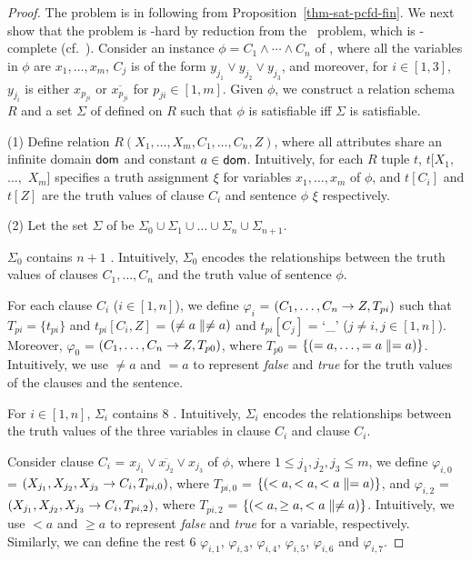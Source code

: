 \begin{proof}
The problem is in \NP following from
Proposition~\ref{thm-sat-pcfd-fin}. We next show that the problem is
\NP-hard by reduction from the \kSAT\ problem, which is \NP-complete
(cf.~\cite{GaJo79}). Consider an instance $\phi = C_1 \land \cdots
\land C_n$ of \kSAT, where all the variables in $\phi$ are $x_1,
\ldots, x_m$, $C_j$ is of the form $y_{j_1} \lor y_{j_2} \lor
y_{j_3}$, and moreover, for $i\in[1,3]$, $y_{j_i}$ is either
$x_{p_{ji}}$ or $\overline{x_{p_{ji}}}$ for $p_{ji} \in [1, m]$.
Given $\phi$, we construct a relation schema $R$ and a set $\Sigma$
of \pCFDs defined on $R$ such that $\phi$ is satisfiable iff
$\Sigma$ is satisfiable.

\noindent (1) Define relation $R$$(X_1, \ldots, X_m, C_1, \ldots,
C_n, Z)$, where all attributes share an infinite domain $\protect\mathsf{dom}$ and
constant $a\in\protect\mathsf{dom}$. Intuitively, for each $R$ tuple $t$, $t[X_1,$ $
\ldots,$ $X_m]$ specifies a truth assignment $\xi$ for variables
$x_1, \ldots, x_m$ of $\phi$, and $t[C_i]$ and $t[Z]$ are the truth
values of clause $C_i$ and sentence $\phi$ \wrt $\xi$ respectively.

\noindent (2) Let the set $\Sigma$ of \pCFDs be
$\Sigma_0\cup\Sigma_1\cup\ldots\cup\Sigma_n\cup\Sigma_{n+1}$.

\vspace{-1.5ex}\bi
\item $\Sigma_0$ contains $n + 1$ \pCFDs. Intuitively, $\Sigma_0$
encodes the relationships between the truth values of clauses $C_1,
\ldots, C_n$ and the truth value of sentence $\phi$.

For each clause $C_i$ ($i\in[1, n]$), we define \pCFD $\varphi_i$ =
$(C_1,\ldots, C_n\rightarrow Z, T_{pi})$ such that $T_{pi} = \{t_{pi}\}$ and
$t_{pi}[C_i,Z]$ = $(\ne a \parallel \ne a)$ and $t_{pi}[C_j]$ = `\_'
($j\ne i, j\in[1, n]$). Moreover, \pCFD $\varphi_{0}$ =
$(C_1,\ldots, C_n\rightarrow Z, T_{p0})$, where $T_{p0}$ = $\{(= a, \ldots,
=a \parallel = a)\}$. Intuitively, we use $\ne a$ and $= a$ to represent
{\em false} and {\em true} for the truth values of the clauses and
the sentence.

\item For $i\in[1, n]$, $\Sigma_i$ contains $8$ \pCFDs.  Intuitively, $\Sigma_i$
encodes the relationships between the truth values of the three
variables in clause $C_i$ and clause $C_i$.

Consider clause $C_i$ = $x_{j_1} \lor \overline{x_{j_2}} \lor
x_{j_3}$ of $\phi$, where $1\le j_1, j_2, j_3 \le m$, we define
\pCFDs $\varphi_{i,0}$ = $(X_{j_1},X_{j_2},X_{j_3}\rightarrow C_i,
T_{pi,0})$, where $T_{pi,0}$ = $\{(< a, < a, <a \parallel = a)\}$, and
$\varphi_{i,2}$ = $(X_{j_1},X_{j_2},X_{j_3}\rightarrow C_i, T_{pi,2})$,
where $T_{pi,2}$ = $\{(< a, \ge a, < a \parallel \ne a)\}$. Intuitively,
we use $<a$ and $\ge a$ to represent {\em false} and {\em true} for
a variable, respectively. Similarly, we can define the rest $6$
\pCFDs $\varphi_{i,1}$, $\varphi_{i,3}$, $\varphi_{i,4}$,
$\varphi_{i,5}$, $\varphi_{i,6}$ and $\varphi_{i,7}$.


\end{proof}
